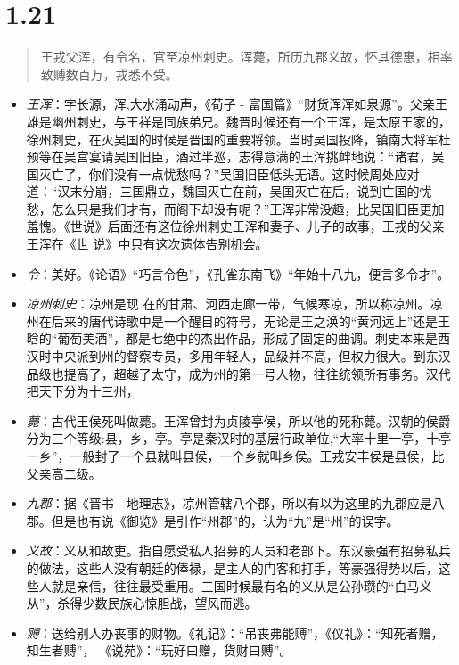 \documentclass[]{book}
\providecommand{\tightlist}{%
  \setlength{\itemsep}{0pt}\setlength{\parskip}{0pt}}
\begin{document}
\section{1.21}\label{section-20}

\begin{quote}
王戎父浑，有令名，官至凉州刺史。浑薨，所历九郡义故，怀其德惠，相率致赙数百万，戎悉不受。
\end{quote}

\begin{itemize}
\tightlist
\item
  \emph{王浑}：字长源，浑,大水涌动声，《荀子 -
  富国篇》``财货浑浑如泉源''。父亲王雄是幽州刺史，与王祥是同族弟兄。魏晋时候还有一个王浑，是太原王家的，徐州刺史，在灭吴国的时候是晋国的重要将领。当时吴国投降，镇南大将军杜预等在吴宫宴请吴国旧臣，酒过半巡，志得意满的王浑挑衅地说：``诸君，吴国灭亡了，你们没有一点忧愁吗？''吴国旧臣低头无语。这时候周处应对道：``汉末分崩，三国鼎立，魏国灭亡在前，吴国灭亡在后，说到亡国的忧愁，怎么只是我们才有，而阁下却没有呢？''王浑非常没趣，比吴国旧臣更加羞愧。《世说》后面还有这位徐州刺史王浑和妻子、儿子的故事，王戎的父亲王浑在《世
  说》中只有这次遗体告别机会。
\item
  \emph{令}：美好。《论语》``巧言令色''，《孔雀东南飞》``年始十八九，便言多令才''。
\item
  \emph{凉州刺史}：凉州是现
  在的甘肃、河西走廊一带，气候寒凉，所以称凉州。凉州在后来的唐代诗歌中是一个醒目的符号，无论是王之涣的``黄河远上''还是王晗的``葡萄美酒''，都是七绝中的杰出作品，形成了固定的曲调。刺史本来是西汉时中央派到州的督察专员，多用年轻人，品级并不高，但权力很大。到东汉品级也提高了，超越了太守，成为州的第一号人物，往往统领所有事务。汉代把天下分为十三州，
\item
  \emph{薨}：古代王侯死叫做薨。王浑曾封为贞陵亭侯，所以他的死称薨。汉朝的侯爵分为三个等级:县，乡，亭。亭是秦汉时的基层行政单位,``大率十里一亭，十亭一乡''，一般封了一个县就叫县侯，一个乡就叫乡侯。王戎安丰侯是县侯，比父亲高二级。
\item
  \emph{九郡}：据《晋书 -
  地理志》，凉州管辖八个郡，所以有以为这里的九郡应是八郡。但是也有说《御览》是引作``州郡''的，认为``九''是``州''的误字。
\item
  \emph{义故}：义从和故吏。指自愿受私人招募的人员和老部下。东汉豪强有招募私兵的做法，这些人没有朝廷的俸禄，是主人的门客和打手，等豪强得势以后，这些人就是亲信，往往最受重用。三国时候最有名的义从是公孙瓒的``白马义从''，杀得少数民族心惊胆战，望风而逃。
\item
  \emph{赙}：送给别人办丧事的财物。《礼记》：``吊丧弗能赙''，《仪礼》：``知死者赠，知生者赙''，
  《说苑》：``玩好曰赠，货财曰赙''。
\end{itemize}
\end{document}
